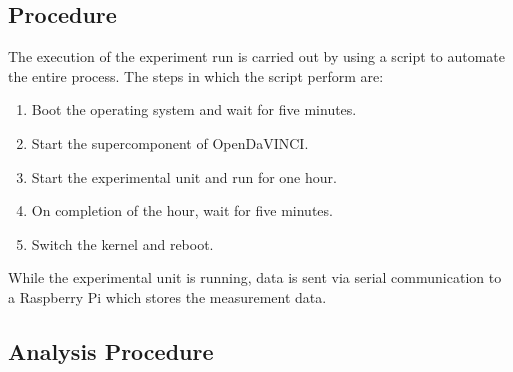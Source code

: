 \subsection{Procedure}

The execution of the experiment run is carried out by using a script to automate the entire process. The steps in which the script perform are:\\

\begin{enumerate}  
\item Boot the operating system and wait for five minutes.  
\item Start the supercomponent of OpenDaVINCI.
\item Start the experimental unit and run for one hour.
\item On completion of the hour, wait for five minutes.
\item Switch the kernel and reboot.\\ 
\end{enumerate}

While the experimental unit is running, data is sent via serial communication to a Raspberry Pi which stores the measurement data. 


\subsection{Analysis Procedure}















